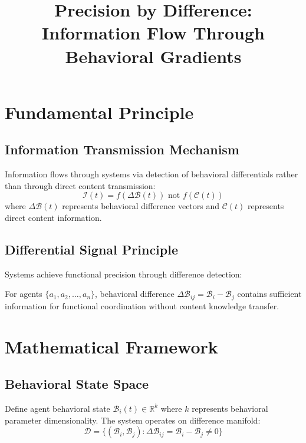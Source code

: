 \documentclass{article}
\title{Precision by Difference: Information Flow Through Behavioral Gradients}
\author{}
\date{}
\begin{document}
\maketitle

\section{Fundamental Principle}

\subsection{Information Transmission Mechanism}
\begin{definition}
Information flows through systems via detection of behavioral differentials rather than through direct content transmission:
$$\mathcal{I}(t) = f(\Delta \mathcal{B}(t)) \text{ not } f(\mathcal{C}(t))$$
where $\Delta \mathcal{B}(t)$ represents behavioral difference vectors and $\mathcal{C}(t)$ represents direct content information.
\end{definition}

\subsection{Differential Signal Principle}
Systems achieve functional precision through difference detection:
\begin{theorem}
For agents $\{a_1, a_2, \ldots, a_n\}$, behavioral difference $\Delta \mathcal{B}_{ij} = \mathcal{B}_i - \mathcal{B}_j$ contains sufficient information for functional coordination without content knowledge transfer.
\end{theorem}

\section{Mathematical Framework}

\subsection{Behavioral State Space}
Define agent behavioral state $\mathcal{B}_i(t) \in \mathbb{R}^k$ where $k$ represents behavioral parameter dimensionality. The system operates on difference manifold:
$$\mathcal{D} = \{(\mathcal{B}_i, \mathcal{B}_j) : \Delta \mathcal{B}_{ij} = \mathcal{B}_i - \mathcal{B}_j \neq 0\}$$
\end{document}
